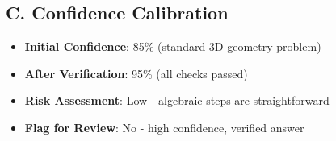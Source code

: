 \documentclass[12pt]{article}
\begin{document}
\begin{verificationbox}
\subsection*{C. Confidence Calibration}
\begin{itemize}[leftmargin=*]
    \item \textbf{Initial Confidence}: 85\% (standard 3D geometry problem)
    \item \textbf{After Verification}: 95\% (all checks passed)
    \item \textbf{Risk Assessment}: Low - algebraic steps are straightforward
    \item \textbf{Flag for Review}: No - high confidence, verified answer
\end{itemize}
\end{verificationbox}
\end{document}
